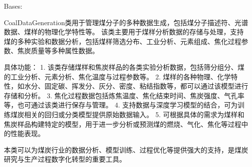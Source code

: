 \documentclass[a4paper,12pt,english]{sphinxmanual}
\begin{document}
\begin{fulllineitems}
\label{\detokenize{api/coalData:coalData.CoalDataGeneration}}
\pysigstartsignatures
{}
\pysigstopsignatures
\sphinxAtStartPar
Bases: 

\sphinxAtStartPar
CoalDataGeneration类用于管理煤分子的多种数据生成，包括煤分子描述符、光谱数据、煤样的物理化学特性等。
该类主要用于煤样分析数据的存储与处理，支持煤的多种实验和数据分析，包括煤样筛选分布、工业分析、元素组成、焦化过程参数、焦炭质量等多种属性数据。

\sphinxAtStartPar
具体功能：
1. 该类存储煤样和焦炭样品的各类实验分析数据，包括筛分组分、煤的工业分析、元素分析、焦化温度与过程参数等。
2. 煤样的各种物理、化学特性，如水分、固定碳、挥发分、灰分、密度、粘结指数等，都可以通过该模型进行存储和分析。
3. 焦化过程数据包括炼焦温度、焦化结束时间、焦炭强度、气孔率等，也可通过该类进行保存与管理。
4. 支持数据与深度学习模型的结合，可为训练煤炭相关的回归或分类模型提供原始数据输入。
5. 可根据具体的需求为煤样和焦炭样品构建特定的模型，用于进一步分析或预测煤的燃烧、气化、焦化等过程中的性能表现。

\sphinxAtStartPar
本类可以为煤炭行业的数据分析、模型训练、过程优化等提供强大的支持，是煤炭研究与生产过程数字化转型的重要工具。

\begin{fulllineitems}
\label{\detokenize{api/coalData:coalData.CoalDataGeneration.Al2O3}}
\pysigstartsignatures
{}
\pysigstopsignatures
\end{fulllineitems}


\begin{fulllineitems}
\label{\detokenize{api/coalData:coalData.CoalDataGeneration.CaO}}
\pysigstartsignatures
{}
\pysigstopsignatures
\end{fulllineitems}



\end{fulllineitems}
\end{document}
